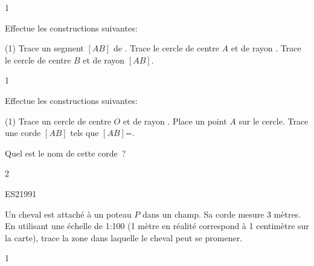 \documentclass[a4paper,11pt]{report}
\begin{document}
\begin{exop}
{\begin{center}
\end{center}
}
{1}
\end{exop}

\begin{exo}
{Effectue les constructions suivantes:
\begin{tasks}(1)
	\task Trace un segment $[AB]$ de .
	\task Trace le cercle de centre $A$ et de rayon .
    \task Trace le cercle de centre $B$ et de rayon $[AB]$.
\end{tasks}
}
{1}
\end{exo}

\begin{exo}
{Effectue les constructions suivantes:
\begin{tasks}(1)
	\task Trace un cercle de centre $O$ et de rayon .
    \task Place un point $A$ sur le cercle. Trace une corde $[AB]$ tels que  $[AB]$=.
\end{tasks}
Quel est le nom de cette corde~? 
}
{2}
\end{exo}

\begin{exol}{ES21}{99}{1}
\end{exol}


\begin{exo}
{Un cheval est attaché à un poteau $P$ dans un champ. Sa corde mesure 3 mètres. En utilisant une échelle de 1:100 (1 mètre en réalité correspond à 1 centimètre sur la carte), trace la zone dans laquelle le cheval peut se promener.

}
{1}
\end{exo}
\end{document}

